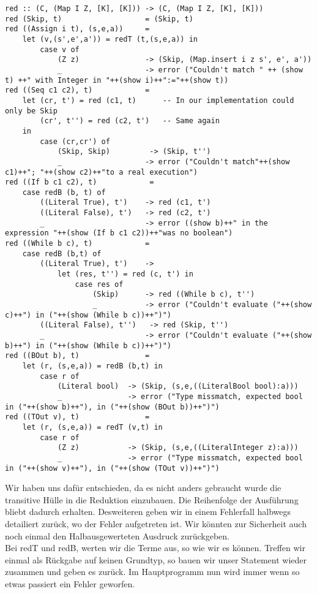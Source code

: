 \documentclass[11pt,a4paper,ngerman]{article}
\begin{document}
\begin{enumerate}[a)]
\begin{lstlisting}
red :: (C, (Map I Z, [K], [K])) -> (C, (Map I Z, [K], [K]))
red (Skip, t)                   = (Skip, t)
red ((Assign i t), (s,e,a))     = 
    let (v,(s',e',a')) = redT (t,(s,e,a)) in
        case v of
            (Z z)               -> (Skip, (Map.insert i z s', e', a'))
            _                   -> error ("Couldn't match " ++ (show t) ++" with Integer in "++(show i)++":="++(show t))
red ((Seq c1 c2), t)            =
    let (cr, t') = red (c1, t)      -- In our implementation could only be Skip
        (cr', t'') = red (c2, t')   -- Same again
    in
        case (cr,cr') of
            (Skip, Skip)         -> (Skip, t'')
            _                   -> error ("Couldn't match"++(show c1)++"; "++(show c2)++"to a real execution")
red ((If b c1 c2), t)            =
    case redB (b, t) of
        ((Literal True), t')    -> red (c1, t')
        ((Literal False), t')   -> red (c2, t')
        _                       -> error ((show b)++" in the expression "++(show (If b c1 c2))++"was no boolean")
red ((While b c), t)            =
    case redB (b,t) of
        ((Literal True), t')    -> 
            let (res, t'') = red (c, t') in
                case res of
                    (Skip)      -> red ((While b c), t'')
                    _           -> error ("Couldn't evaluate ("++(show c)++") in ("++(show (While b c))++")")
        ((Literal False), t'')   -> red (Skip, t'')
        _                       -> error ("Couldn't evaluate ("++(show b)++") in ("++(show (While b c))++")")
red ((BOut b), t)               =
    let (r, (s,e,a)) = redB (b,t) in
        case r of
            (Literal bool)  -> (Skip, (s,e,((LiteralBool bool):a)))
            _               -> error ("Type missmatch, expected bool in ("++(show b)++"), in ("++(show (BOut b))++")")
red ((TOut v), t)               =
    let (r, (s,e,a)) = redT (v,t) in
        case r of
            (Z z)           -> (Skip, (s,e,((LiteralInteger z):a)))
            _               -> error ("Type missmatch, expected bool in ("++(show v)++"), in ("++(show (TOut v))++")")
            \end{lstlisting}

            Wir haben uns dafür entschieden, da es nicht anders gebraucht wurde die transitive Hülle
            in die Reduktion einzubauen. Die Reihenfolge der Ausführung bliebt dadurch erhalten.
            Desweiteren geben wir in einem Fehlerfall halbwegs detailiert zurück, wo der Fehler
            aufgetreten ist. Wir könnten zur Sicherheit auch noch einmal den Halbausgewerteten Ausdruck
            zurückgeben.\\
            Bei redT und redB, werten wir die Terme aus, so wie wir es können. Treffen wir einmal
            als Rückgabe auf keinen Grundtyp, so bauen wir unser Statement wieder zusammen und geben
            es zurück. Im Hauptprogramm nun wird immer wenn so etwas passiert ein Fehler geworfen.


\end{enumerate}
\end{document}
